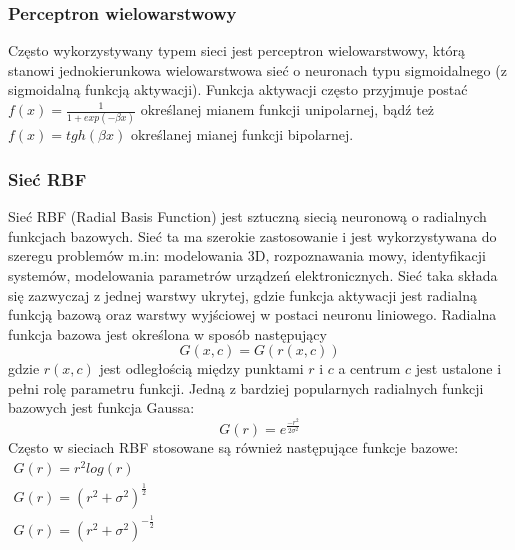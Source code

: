 \subsubsection*{Perceptron wielowarstwowy}
Często wykorzystywany typem sieci jest perceptron wielowarstwowy, którą stanowi jednokierunkowa wielowarstwowa sieć o neuronach typu sigmoidalnego (z sigmoidalną funkcją aktywacji)\cite{Osowski}. Funkcja aktywacji często przyjmuje postać $f(x) = \frac{1}{1 + exp(-\beta x)}$ określanej mianem funkcji unipolarnej, bądź też $f(x) = tgh(\beta x)$ określanej mianej funkcji bipolarnej.
 
\subsubsection*{Sieć RBF}
Sieć RBF (Radial Basis Function) jest sztuczną siecią neuronową o radialnych funkcjach bazowych. Sieć ta ma szerokie zastosowanie i jest wykorzystywana do szeregu problemów m.in: modelowania 3D, rozpoznawania mowy, identyfikacji systemów, modelowania parametrów urządzeń elektronicznych\cite{Bors}. Sieć taka składa się zazwyczaj z jednej warstwy ukrytej, gdzie funkcja aktywacji jest radialną funkcją bazową oraz warstwy wyjściowej w postaci neuronu liniowego. Radialna funkcja bazowa jest określona w sposób następujący\cite{Bartkowiak}
\begin{equation}
	G(x,c) = G(r(x,c))
\end{equation}
gdzie $r(x,c)$ jest odległością między punktami $r$ i $c$ a centrum $c$ jest ustalone i pełni rolę parametru funkcji. Jedną z bardziej popularnych radialnych funkcji bazowych jest funkcja Gaussa:
\begin{equation}
	G(r) = e^{\frac{-r^2}{2\sigma^2}}
\end{equation}
Często w sieciach RBF stosowane są również następujące funkcje bazowe\cite{Chen}: \\
$\begin{array}{l}
 G(r) = r^2 log(r)\\
 G(r) = (r^2 + \sigma^2)^{\frac{1}{2}} \\
 G(r) = (r^2 + \sigma^2)^{-\frac{1}{2}}
\end{array}
$
